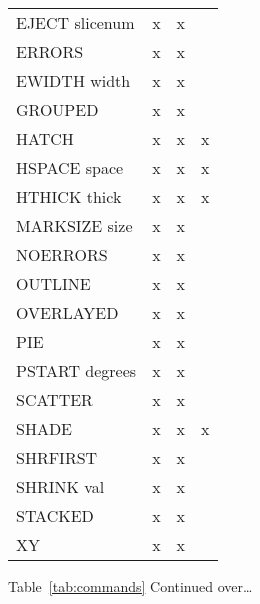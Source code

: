 \documentclass{report}
\begin{document}
\begin{center}
\begin{tabular}{lccc}
EJECT  slicenum                  &     x     &     x  &                    \\
ERRORS                           &     x     &     x  &                    \\
EWIDTH  width                    &     x     &     x  &                    \\
GROUPED                          &     x     &     x  &                    \\
HATCH                            &     x     &     x  &       x            \\
HSPACE  space                    &     x     &     x  &       x            \\
HTHICK  thick                    &     x     &     x  &       x            \\
MARKSIZE  size                   &     x     &     x  &                    \\
NOERRORS                         &     x     &     x  &                    \\
OUTLINE                          &     x     &     x  &                    \\
OVERLAYED                        &     x     &     x  &                    \\
PIE                              &     x     &     x  &                    \\
PSTART  degrees                  &     x     &     x  &                    \\
SCATTER                          &     x     &     x  &                    \\
SHADE                            &     x     &     x  &       x            \\
SHRFIRST                         &     x     &     x  &                    \\
SHRINK  val                      &     x     &     x  &                    \\
STACKED                          &     x     &     x  &                    \\
XY                               &     x     &     x  &                    \\ \hline
\end{tabular}
\normalsize
\end{center}
Table~\ref{tab:commands} Continued over\ldots
\end{document}
